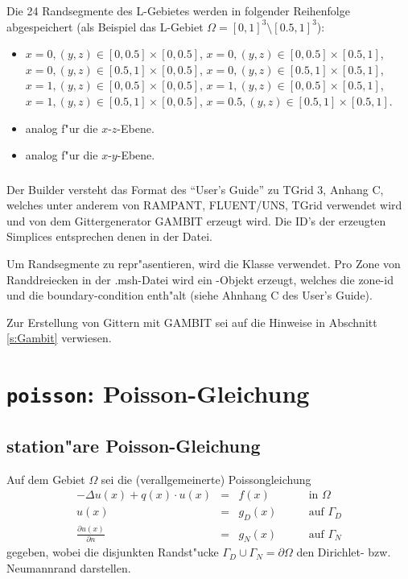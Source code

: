 \documentclass[11pt,a4paper]{article}
\begin{document}
Die 24 Randsegmente des L-Gebietes werden in folgender Reihenfolge
abgespeichert (als Beispiel das L-Gebiet $\Omega=[0,1]^3\setminus [0.5,1]^3$):
\begin{itemize}
    \item $x=0, (y,z)\in[0,0.5]\times[0,0.5]$, \quad
    $x=0, (y,z)\in[0,0.5]\times[0.5,1]$, \quad
    $x=0, (y,z)\in[0.5,1]\times[0,0.5]$, \quad
    $x=0, (y,z)\in[0.5,1]\times[0.5,1]$, \\
    $x=1, (y,z)\in[0,0.5]\times[0,0.5]$, \quad
    $x=1, (y,z)\in[0,0.5]\times[0.5,1]$, \quad
    $x=1, (y,z)\in[0.5,1]\times[0,0.5]$, \quad
    $x=0.5, (y,z)\in[0.5,1]\times[0.5,1]$.
    \item analog f"ur die $x$-$z$-Ebene.
    \item analog f"ur die $x$-$y$-Ebene.
\end{itemize}

\subsubsection{}
\label{ss:MeshBuilder}
Der Builder versteht das Format des "`User's Guide"' zu TGrid 3, Anhang C, welches
unter anderem von RAMPANT, FLUENT/UNS, TGrid verwendet wird und von dem
Gittergenerator GAMBIT erzeugt wird.
Die ID's der erzeugten Simplices entsprechen denen in der Datei.

Um Randsegmente zu repr"asentieren, wird die Klasse  verwendet.
Pro Zone von Randdreiecken in der .msh-Datei wird ein -Objekt
erzeugt, welches die zone-id und die boundary-condition enth"alt (siehe Ahnhang C des
User's Guide).

Zur Erstellung von Gittern mit GAMBIT sei auf die Hinweise in Abschnitt
\ref{s:Gambit} verwiesen.

\section{{\tt poisson}: Poisson-Gleichung}

\subsection{station"are Poisson-Gleichung}

Auf dem Gebiet $\Omega$ sei die (verallgemeinerte) Poissongleichung
\[
\begin{array}{rcll}
    -\Delta u(x) + q(x)\cdot u(x) &=& f(x) & \qquad\mbox{in }\Omega\\
    u(x) &=& g_D(x) & \qquad\mbox{auf }\Gamma_D\\
    \frac{\partial u(x)}{\partial n} &=& g_N(x) & \qquad\mbox{auf }\Gamma_N
\end{array}
\]
gegeben, wobei die disjunkten Randst"ucke $\Gamma_D\cup\Gamma_N=\partial\Omega$
den Dirichlet- bzw. Neumannrand darstellen.
\end{document}
